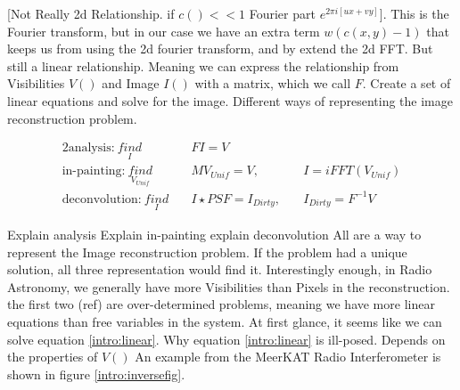 [Not Really 2d Relationship. if $c() << 1$ Fourier part $e^{2 \pi i [ux+vy]}$]. This is the Fourier transform, but in our case we have an extra term $w(c(x, y) - 1)$ that keeps us from using the 2d fourier transform, and by extend the 2d FFT.
But still a linear relationship. Meaning we can express the relationship from Visibilities $V()$ and Image $I()$ with a matrix, which we call $F$.
Create a set of linear equations and solve for the image. Different ways of representing the image reconstruction problem.

\begin{alignat}{2}
\text{analysis:}\: \underset{I}{find}&\quad FI = V \quad &\\
\text{in-painting:}\: \underset{V_{Unif}}{find}&\quad MV_{Unif} = V,  \quad &I = iFFT(V_{Unif})\\
\text{deconvolution:}\: \underset{I}{find}&\quad I \star PSF = I_{Dirty},  \quad &I_{Dirty} = F^{-1}V
\end{alignat}

Explain analysis
Explain in-painting
explain deconvolution
All are a way to represent the Image reconstruction problem. If the problem had a unique solution, all three representation would find it. Interestingly enough, in Radio Astronomy, we generally have more Visibilities than Pixels in the reconstruction. the first two (ref) are over-determined problems, meaning we have more linear equations than free variables in the system.
At first glance, it seems like we can solve equation \eqref{intro:linear}.
Why equation \eqref{intro:linear} is ill-posed. Depends on the properties of $V()$
An example from the MeerKAT Radio Interferometer is shown in figure \ref{intro:inversefig}.

